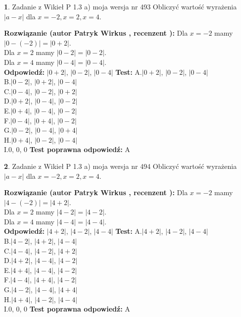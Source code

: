 \documentclass[12pt, a4paper]{article}
\theoremstyle{definition} %
\newtheorem{zad}{}
\newcommand{\zadStart}[1]{\begin{zad}#1\newline}
\newcommand{\zadStop}{\end{zad}}
\newcommand{\rozwStart}[2]{\noindent \textbf{Rozwiązanie (autor #1 , recenzent #2): }\newline}
\newcommand{\rozwStop}{\newline}
\newcommand{\odpStart}{\noindent \textbf{Odpowiedź:}\newline}
\newcommand{\odpStop}{\newline}
\newcommand{\testStart}{\noindent \textbf{Test:}\newline}
\newcommand{\testStop}{\newline}
\newcommand{\kluczStart}{\noindent \textbf{Test poprawna odpowiedź:}\newline}
\newcommand{\kluczStop}{\newline}
\begin{document}
\zadStart{Zadanie z Wikieł P 1.3 a) moja wersja nr 493}
Obliczyć wartość wyrażenia $|a - x|$ dla $x=-2,x=2,x=4$.
\zadStop
\rozwStart{Patryk Wirkus}{}
Dla $x = -2$ mamy $|0 - (-2)| = |0 + 2|$.\\
Dla $x = 2$ mamy $|0 - 2| = |0 - 2|$.\\
Dla $x = 4$ mamy $|0 - 4| = |0 - 4|$.\\
\rozwStop
\odpStart
$|0 + 2|$, $|0 - 2|$, $|0 - 4|$
\odpStop
\testStart
A.$|0 + 2|$, $|0 - 2|$, $|0 - 4|$\\
B.$|0 - 2|$, $|0 + 2|$, $|0 - 4|$\\
C.$|0 - 4|$, $|0 - 2|$, $|0 + 2|$\\
D.$|0 + 2|$, $|0 - 4|$, $|0 - 2|$\\
E.$|0 + 4|$, $|0 - 4|$, $|0 - 2|$\\
F.$|0 - 4|$, $|0 + 4|$, $|0 - 2|$\\
G.$|0 - 2|$, $|0 - 4|$, $|0 + 4|$\\
H.$|0 + 4|$, $|0 - 2|$, $|0 - 4|$\\
I.$0$, $0$, $0$
\testStop
\kluczStart
A
\kluczStop



\zadStart{Zadanie z Wikieł P 1.3 a) moja wersja nr 494}
Obliczyć wartość wyrażenia $|a - x|$ dla $x=-2,x=2,x=4$.
\zadStop
\rozwStart{Patryk Wirkus}{}
Dla $x = -2$ mamy $|4 - (-2)| = |4 + 2|$.\\
Dla $x = 2$ mamy $|4 - 2| = |4 - 2|$.\\
Dla $x = 4$ mamy $|4 - 4| = |4 - 4|$.\\
\rozwStop
\odpStart
$|4 + 2|$, $|4 - 2|$, $|4 - 4|$
\odpStop
\testStart
A.$|4 + 2|$, $|4 - 2|$, $|4 - 4|$\\
B.$|4 - 2|$, $|4 + 2|$, $|4 - 4|$\\
C.$|4 - 4|$, $|4 - 2|$, $|4 + 2|$\\
D.$|4 + 2|$, $|4 - 4|$, $|4 - 2|$\\
E.$|4 + 4|$, $|4 - 4|$, $|4 - 2|$\\
F.$|4 - 4|$, $|4 + 4|$, $|4 - 2|$\\
G.$|4 - 2|$, $|4 - 4|$, $|4 + 4|$\\
H.$|4 + 4|$, $|4 - 2|$, $|4 - 4|$\\
I.$0$, $0$, $0$
\testStop
\kluczStart
A
\kluczStop
\end{document}
